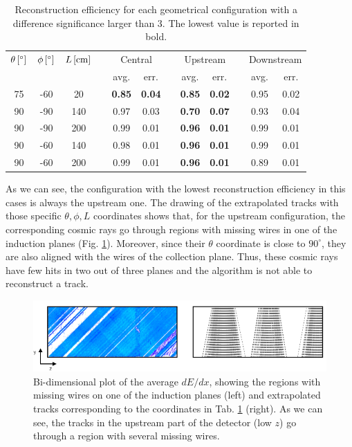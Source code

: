 \documentclass[a4paper]{scrartcl}
\renewcommand{\arraystretch}{1.2}
\newcommand{\ra}[1]{\renewcommand{\arraystretch}{#1}}
\begin{document}
\begin{table}[htbp]
  \centering
  \ra{1.2}
  \begin{tabular}{cccccccccccc}
    \toprule
    $\theta\thinspace[^\circ]$ & $\phi\thinspace[^\circ]$ & $L\thinspace[\mathrm{cm}]$ & \phantom{a} & \multicolumn{2}{c}{Central} & \phantom{a} & \multicolumn{2}{c}{Upstream} & \phantom{a} & \multicolumn{2}{c}{Downstream}\\
     \cmidrule{5-6} \cmidrule{8-9} \cmidrule{11-12}
      &  &  & & avg. & err. & & avg. & err. & & avg. & err.   \\
    \midrule
    75 & -60 & 20 & & \textbf{0.85} & \textbf{0.04} & & \textbf{0.85} & \textbf{0.02} & & 0.95 & 0.02\\
    90 & -90 & 140 & & 0.97 & 0.03 & & \textbf{0.70} & \textbf{0.07} & & 0.93 & 0.04\\
    90 & -90 & 200 & & 0.99 & 0.01 & & \textbf{0.96} & \textbf{0.01} & & 0.99 & 0.01\\
    90 & -60 & 140 & & 0.98 & 0.01 & & \textbf{0.96} & \textbf{0.01} & & 0.99 & 0.01\\
    90 & -60 & 200 & & 0.99 & 0.01 & & \textbf{0.96} & \textbf{0.01} & & 0.89 & 0.01\\

    \bottomrule
  \end{tabular}
  \caption{Reconstruction efficiency for each geometrical configuration with a difference significance larger than 3. The lowest value is reported in bold.}\label{tab:significance}
\end{table}

As we can see, the configuration with the lowest reconstruction efficiency in this cases is always the upstream one. The drawing of the extrapolated tracks with those specific $\theta,\phi,L$ coordinates shows that, for the upstream configuration, the corresponding cosmic rays go through regions with missing wires in one of the induction planes (Fig. \ref{fig:wires}). Moreover, since their $\theta$ coordinate is close to $90^\circ$, they are also aligned with the wires of the collection plane. Thus, these cosmic rays have few hits in two out of three planes and the algorithm is not able to reconstruct a track.

\begin{figure}[htbp]
  \begin{center}
    \includegraphics[width=1\linewidth]{figures/wire_tracks.png}
    \caption{Bi-dimensional plot of the average $dE/dx$, showing the regions with missing wires on one of the induction planes (left) and extrapolated tracks corresponding to the coordinates in Tab. \ref{tab:significance} (right). As we can see, the tracks in the upstream part of the detector (low $z$) go through a region with several missing wires.} \label{fig:wires}
  \end{center}
\end{figure}
\end{document}
